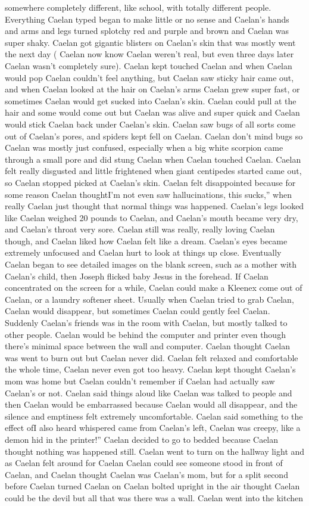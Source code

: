 \documentclass[12pt]{book}
\begin{document}
somewhere completely different, like school, with totally different people. Everything Caelan typed began to make little or no sense and Caelan's hands and arms and legs turned splotchy red and purple and brown and Caelan was super shaky. Caelan got gigantic blisters on Caelan's skin that was mostly went the next day ( Caelan now know Caelan weren't real, but even three days later Caelan wasn't completely sure). Caelan kept touched Caelan and when Caelan would pop Caelan couldn't feel anything, but Caelan saw sticky hair came out, and when Caelan looked at the hair on Caelan's arms Caelan grew super fast, or sometimes Caelan would get sucked into Caelan's skin. Caelan could pull at the hair and some would come out but Caelan was alive and super quick and Caelan would stick Caelan back under Caelan's skin. Caelan saw bugs of all sorts come out of Caelan's pores, and spiders kept fell on Caelan. Caelan don't mind bugs so Caelan was mostly just confused, especially when a big white scorpion came through a small pore and did stung Caelan when Caelan touched Caelan. Caelan felt really disgusted and little frightened when giant centipedes started came out, so Caelan stopped picked at Caelan's skin. Caelan felt disappointed because for some reason Caelan thoughtI'm not even saw hallucinations, this sucks,'' when really Caelan just thought that normal things was happened. Caelan's legs looked like Caelan weighed 20 pounds to Caelan, and Caelan's mouth became very dry, and Caelan's throat very sore. Caelan still was really, really loving Caelan though, and Caelan liked how Caelan felt like a dream. Caelan's eyes became extremely unfocused and Caelan hurt to look at things up close. Eventually Caelan began to see detailed images on the blank screen, such as a mother with Caelan's child, then Joseph flicked baby Jesus in the forehead. If Caelan concentrated on the screen for a while, Caelan could make a Kleenex come out of Caelan, or a laundry softener sheet. Usually when Caelan tried to grab Caelan, Caelan would disappear, but sometimes Caelan could gently feel Caelan. Suddenly Caelan's friends was in the room with Caelan, but mostly talked to other people. Caelan would be behind the computer and printer even though there's minimal space between the wall and computer. Caelan thought Caelan was went to burn out but Caelan never did. Caelan felt relaxed and comfortable the whole time, Caelan never even got too heavy. Caelan kept thought Caelan's mom was home but Caelan couldn't remember if Caelan had actually saw Caelan's or not. Caelan said things aloud like Caelan was talked to people and then Caelan would be embarrassed because Caelan would all disappear, and the silence and emptiness felt extremely uncomfortable. Caelan said something to the effect ofI also heard whispered came from Caelan's left, Caelan was creepy, like a demon hid in the printer!'' Caelan decided to go to bedded because Caelan thought nothing was happened still. Caelan went to turn on the hallway light and as Caelan felt around for Caelan Caelan could see someone stood in front of Caelan, and Caelan thought Caelan was Caelan's mom, but for a split second before Caelan turned Caelan on Caelan bolted upright in the air thought Caelan could be the devil but all that was there was a wall. Caelan went into the kitchen 
\end{document}
